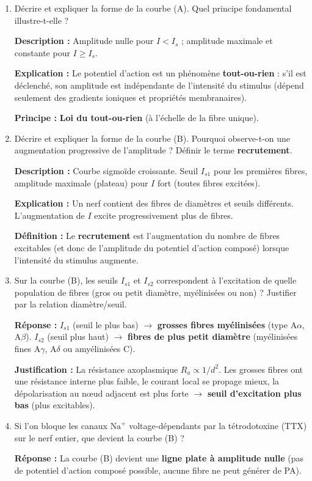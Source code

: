\documentclass[11pt]{article}
\begin{document}
\begin{exercice}
\begin{enumerate}
\item Décrire et expliquer la forme de la courbe (A). Quel principe fondamental illustre-t-elle ?
\par \textbf{Description :} Amplitude nulle pour $I < I_s$ ; amplitude maximale et constante pour $I \ge I_s$.
\par \textbf{Explication :} Le potentiel d'action est un phénomène \textbf{tout-ou-rien} : s'il est déclenché, son amplitude est indépendante de l'intensité du stimulus (dépend seulement des gradients ioniques et propriétés membranaires).
\par \textbf{Principe :} \textbf{Loi du tout-ou-rien} (à l'échelle de la fibre unique).
\item Décrire et expliquer la forme de la courbe (B). Pourquoi observe-t-on une augmentation progressive de l'amplitude ? Définir le terme \textbf{recrutement}.
\par \textbf{Description :} Courbe sigmoïde croissante. Seuil $I_{s1}$ pour les premières fibres, amplitude maximale (plateau) pour $I$ fort (toutes fibres excitées).
\par \textbf{Explication :} Un nerf contient des fibres de diamètres et seuils différents. L'augmentation de $I$ excite progressivement plus de fibres.
\par \textbf{Définition :} Le \textbf{recrutement} est l'augmentation du nombre de fibres excitables (et donc de l'amplitude du potentiel d'action composé) lorsque l'intensité du stimulus augmente.
\item Sur la courbe (B), les seuils $I_{s1}$ et $I_{s2}$ correspondent à l'excitation de quelle population de fibres (gros ou petit diamètre, myélinisées ou non) ? Justifier par la relation diamètre/seuil.
\par \textbf{Réponse :} $I_{s1}$ (seuil le plus bas) $\to$ \textbf{grosses fibres myélinisées} (type A$\alpha$, A$\beta$). $I_{s2}$ (seuil plus haut) $\to$ \textbf{fibres de plus petit diamètre} (myélinisées fines A$\gamma$, A$\delta$ ou amyélinisées C).
\par \textbf{Justification :} La résistance axoplasmique $R_a \propto 1/d^2$. Les grosses fibres ont une résistance interne plus faible, le courant local se propage mieux, la dépolarisation au nœud adjacent est plus forte $\to$ \textbf{seuil d'excitation plus bas} (plus excitables).
\item Si l'on bloque les canaux $\text{Na}^+$ voltage-dépendants par la tétrodotoxine (TTX) sur le nerf entier, que devient la courbe (B) ?
\par \textbf{Réponse :} La courbe (B) devient une \textbf{ligne plate à amplitude nulle} (pas de potentiel d'action composé possible, aucune fibre ne peut générer de PA).
\end{enumerate}
\end{exercice}
\end{document}
